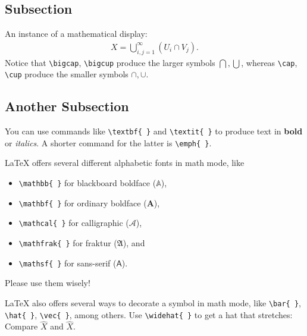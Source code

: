 \documentclass[a4paper,10pt,leqno]{article}
\numberwithin{equation}{section}
\theoremstyle{plain}
\theoremstyle{definition}
\theoremstyle{remark}
\begin{document}
\subsection{Subsection}

An instance of a mathematical display:
\begin{align}\label{eq:1}
X = \bigcup_{i, j = 1}^\infty {(U_i \cap V_j)}.
\end{align}
Notice that \texttt{\textbackslash{}bigcap}, \texttt{\textbackslash{}bigcup} produce the larger symbols $\bigcap, \bigcup$, whereas \texttt{\textbackslash{}cap}, \texttt{\textbackslash{}cup} produce the smaller symbols $\cap, \cup$.

\subsection{Another Subsection} 

You can use commands like \texttt{\textbackslash{}textbf\{ \}} and  \texttt{\textbackslash{}textit\{ \}} to produce text in \textbf{bold} or \textit{italics}.
A shorter command for the latter is \texttt{\textbackslash{}emph\{ \}}.

\LaTeX{} offers several different alphabetic fonts in math mode, like
\begin{itemize} 
\item 	\texttt{\textbackslash{}mathbb\{ \}} for blackboard boldface ($\mathbb{A}$),

\item 	\texttt{\textbackslash{}mathbf\{ \}} for ordinary boldface ($\mathbf{A}$), 

\item 	\texttt{\textbackslash{}mathcal\{ \}} for calligraphic ($\mathcal{A}$),

\item 	\texttt{\textbackslash{}mathfrak\{ \}} for fraktur ($\mathfrak{A}$), and

\item 	\texttt{\textbackslash{}mathsf\{ \}} for sans-serif ($\mathsf{A}$).

\end{itemize}
Please use them wisely!

\LaTeX{} also offers several ways to decorate a symbol in math mode, like \texttt{\textbackslash{}bar\{ \}}, \texttt{\textbackslash{}hat\{ \}}, \texttt{\textbackslash{}vec\{ \}}, among others.
Use \texttt{\textbackslash{}widehat\{ \}} to get a hat that stretches:
Compare $\hat{X}$ and $\widehat{X}$.
\end{document}

